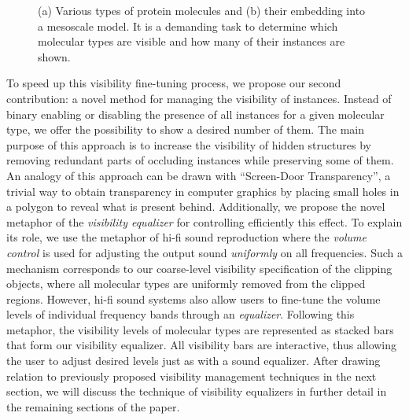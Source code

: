 \begin{figure}[t]
\centering
{}
\caption{\label{fig:which} (a) Various types of protein molecules and (b) their embedding into a mesoscale  model. It is a demanding task to determine which molecular types are visible and how many of their instances are shown.}
\end{figure}


To speed up this visibility fine-tuning process, we propose our second contribution: a novel method for managing the visibility of instances. Instead of binary enabling or disabling the presence of all instances for a given molecular type, we offer the possibility to show a desired number of them.
The main purpose of this approach is to increase the visibility of hidden structures by removing redundant parts of occluding instances while preserving some of them.
An analogy of this approach can be drawn with ``Screen-Door Transparency'', a trivial way to obtain transparency in computer graphics by placing small holes in a polygon to reveal what is present behind.
Additionally, we propose the novel metaphor of the \emph{visibility equalizer} for controlling efficiently this effect.
To explain its role, we use the metaphor of hi-fi sound reproduction where the \textit{volume control} is used for adjusting the output sound \textit{uniformly} on all frequencies. 
Such a mechanism corresponds to our coarse-level visibility specification of the clipping objects, where all molecular types are uniformly removed from the clipped regions.
However, hi-fi sound systems also allow users to fine-tune the volume levels of individual frequency bands through an \emph{equalizer}.
Following this metaphor, the visibility levels of molecular types are represented as stacked bars that form our visibility equalizer.
All visibility bars are interactive, thus allowing the user to adjust desired levels just as with a sound equalizer. After drawing relation to previously proposed visibility management techniques in the next section, we will discuss the technique of visibility equalizers in further detail in the remaining sections of the paper.
